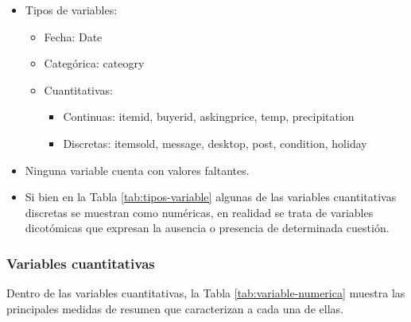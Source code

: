 \documentclass[
  12pt]{article}
\providecommand{\tightlist}{%
  \setlength{\itemsep}{0pt}\setlength{\parskip}{0pt}}
\begin{document}
\begin{itemize}
\tightlist
\item
  Tipos de variables:

  \begin{itemize}
  \tightlist
  \item
    Fecha: Date
  \item
    Categórica: cateogry
  \item
    Cuantitativas:

    \begin{itemize}
    \tightlist
    \item
      Continuas: itemid, buyerid, askingprice, temp, precipitation
    \item
      Discretas: itemsold, message, desktop, post, condition, holiday
    \end{itemize}
  \end{itemize}
\item
  Ninguna variable cuenta con valores faltantes.
\item
  Si bien en la Tabla \ref{tab:tipos-variable} algunas de las variables cuantitativas discretas se muestran como numéricas, en realidad se trata de variables dicotómicas que expresan la ausencia o presencia de determinada cuestión.
\end{itemize}

\hypertarget{variables-cuantitativas}{%
\subsubsection{Variables cuantitativas}\label{variables-cuantitativas}}

Dentro de las variables cuantitativas, la Tabla \ref{tab:variable-numerica} muestra las principales medidas de resumen que caracterizan a cada una de ellas.
\end{document}
